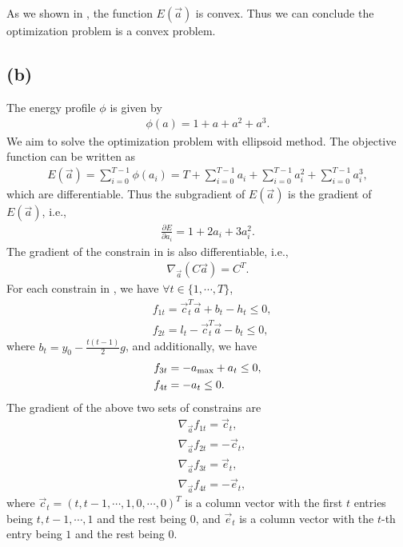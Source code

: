 \documentclass[letterpaper,10pt]{article}
\begin{document}
As we shown in , the function $E(\vec a)$ is convex.
Thus we can conclude the optimization problem is a convex problem.

\subsection*{(b)}

The energy profile $\phi$ is given by
\begin{align}
    \phi(a)=1+a+a^2+a^3.
\end{align}
We aim to solve the optimization problem with ellipsoid method.
The objective function can be written as
\begin{align}
    E(\vec a)=\sum_{i=0}^{T-1} \phi(a_i)=T+\sum_{i=0}^{T-1} a_i + \sum_{i=0}^{T-1} a_i^2 + \sum_{i=0}^{T-1} a_i^3,
\end{align}
which are differentiable.
Thus the subgradient of $E(\vec a)$ is the gradient of $E(\vec a)$, i.e.,
\begin{align}
    \frac{\partial E}{\partial a_i} = 1 + 2a_i + 3a_i^2.
\end{align}
The gradient of the constrain in  is also differentiable, i.e.,
\begin{align}
    \nabla_{\vec a} (C \vec a) = C^T.
\end{align}
For each constrain in , we have $\forall t\in \{1,\cdots,T\}$,
\begin{align}
    &f_{1t}=\vec c_t^T \vec a + b_t -h_t\le 0,\\
    &f_{2t}=l_t - \vec c_t^T \vec a - b_t\le 0,
\end{align}
where $b_t=y_0-\frac{t(t-1)}{2}g$, and additionally, we have
\begin{align}
    &f_{3t}=-a_{\rm max} + a_t \le 0,\\
    &f_{4t}=- a_t \le 0.
\end{align}
The gradient of the above two sets of constrains are
\begin{align}
    &\nabla_{\vec a} f_{1t}=\vec c_t,\\
    &\nabla_{\vec a} f_{2t}=-\vec c_t,\\
    &\nabla_{\vec a} f_{3t}=\vec e_t,\\
    &\nabla_{\vec a} f_{4t}=-\vec e_t,
\end{align}
where $\vec c_t=(t, t-1, \cdots, 1, 0, \cdots, 0)^T$ is a column vector with the first $t$ entries being $t, t-1, \cdots, 1$ and the rest being $0$, and $\vec e_t$ is a column vector with the $t$-th entry being $1$ and the rest being $0$.
\end{document}
